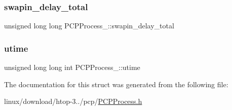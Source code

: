 \subsubsection{\texorpdfstring{swapin\+\_\+delay\+\_\+total}{swapin\_delay\_total}}
{\footnotesize\ttfamily unsigned long long P\+C\+P\+Process\+\_\+\+::swapin\+\_\+delay\+\_\+total}

\mbox{\label{structPCPProcess___ad1ea83bfdd17df3e7caa7300fe6f9d11}} 
\subsubsection{\texorpdfstring{utime}{utime}}
{\footnotesize\ttfamily unsigned long long int P\+C\+P\+Process\+\_\+\+::utime}



The documentation for this struct was generated from the following file\+:\begin{DoxyCompactItemize}
\item 
linux/download/htop-\/3../pcp/\hyperlink{PCPProcess_8h}{P\+C\+P\+Process.\+h}\end{DoxyCompactItemize}
